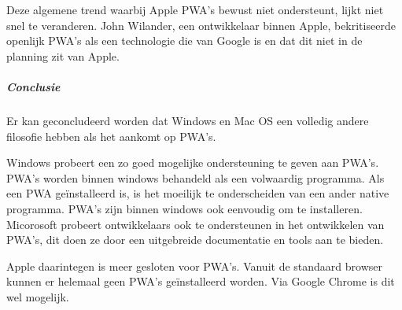 	Deze algemene trend waarbij Apple PWA's bewust niet ondersteunt, lijkt niet snel te veranderen. John Wilander, een ontwikkelaar binnen Apple, bekritiseerde openlijk PWA's als een technologie die van Google is en dat dit niet in de planning zit van Apple. 
	\autocite{Wilander2019}
	
	
	\subparagraph{Conclusie}
	Er kan geconcludeerd worden dat Windows en Mac OS een volledig andere filosofie hebben als het aankomt op PWA's. 
	
	Windows probeert een zo goed mogelijke ondersteuning te geven aan PWA's. PWA's worden binnen windows behandeld als een volwaardig programma. Als een PWA geïnstalleerd is, is het moeilijk te onderscheiden van een ander native programma.
	PWA's zijn binnen windows ook eenvoudig om te installeren.
	Micorosoft probeert ontwikkelaars ook te ondersteunen in het ontwikkelen van PWA's, dit doen ze door een uitgebreide documentatie en tools aan te bieden.
	
	Apple daarintegen is meer gesloten voor PWA's. Vanuit de standaard browser kunnen er helemaal geen PWA's geïnstalleerd worden. Via Google Chrome is dit wel mogelijk.
	